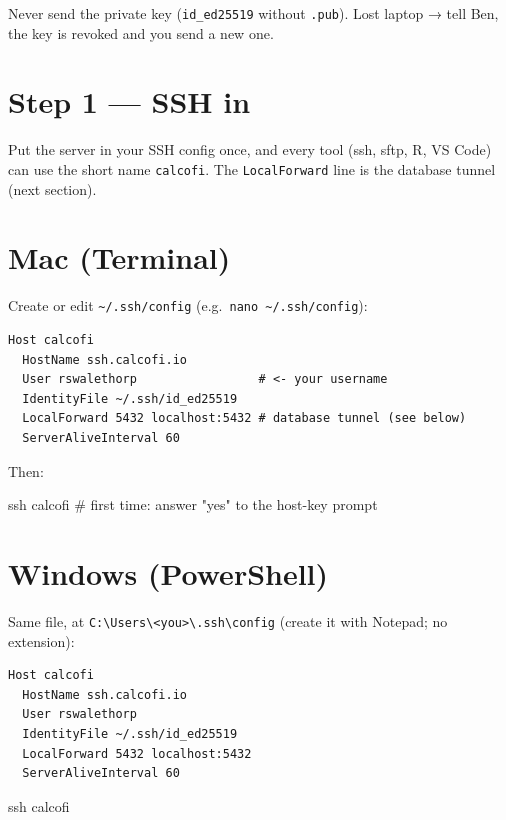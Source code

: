 \documentclass[
  letterpaper,
  DIV=11,
  numbers=noendperiod]{scrreprt}
\newenvironment{Shaded}{\begin{snugshade}}{\end{snugshade}}
\newcommand{\CommentTok}[1]{\textcolor[rgb]{0.37,0.37,0.37}{#1}}
\newcommand{\FunctionTok}[1]{\textcolor[rgb]{0.28,0.35,0.67}{#1}}
\newcommand{\NormalTok}[1]{\textcolor[rgb]{0.00,0.23,0.31}{#1}}
\begin{document}
Never send the private key (\texttt{id\_ed25519} without \texttt{.pub}).
Lost laptop → tell Ben, the key is revoked and you send a new one.

\section{Step 1 --- SSH in}\label{sec-ssh}

Put the server in your SSH config once, and every tool (ssh, sftp, R, VS
Code) can use the short name \texttt{calcofi}. The \texttt{LocalForward}
line is the database tunnel (next section).

\section{Mac (Terminal)}

Create or edit \texttt{\textasciitilde{}/.ssh/config}
(e.g.~\texttt{nano\ \textasciitilde{}/.ssh/config}):

\begin{verbatim}
Host calcofi
  HostName ssh.calcofi.io
  User rswalethorp                 # <- your username
  IdentityFile ~/.ssh/id_ed25519
  LocalForward 5432 localhost:5432 # database tunnel (see below)
  ServerAliveInterval 60
\end{verbatim}

Then:

\begin{Shaded}
\begin{Highlighting}[]
\FunctionTok{ssh}\NormalTok{ calcofi            }\CommentTok{\# first time: answer "yes" to the host{-}key prompt}
\end{Highlighting}
\end{Shaded}

\section{Windows (PowerShell)}

Same file, at
\texttt{C:\textbackslash{}Users\textbackslash{}\textless{}you\textgreater{}\textbackslash{}.ssh\textbackslash{}config}
(create it with Notepad; no extension):

\begin{verbatim}
Host calcofi
  HostName ssh.calcofi.io
  User rswalethorp
  IdentityFile ~/.ssh/id_ed25519
  LocalForward 5432 localhost:5432
  ServerAliveInterval 60
\end{verbatim}

\begin{Shaded}
\begin{Highlighting}[]
\NormalTok{ssh calcofi}
\end{Highlighting}
\end{Shaded}
\end{document}
